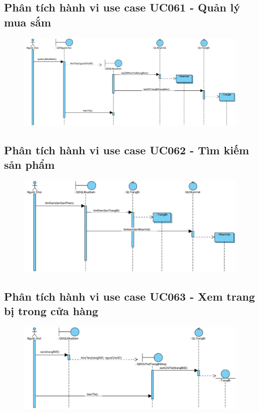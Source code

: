 \documentclass[3p]{elsarticle}
\begin{document}
\subsection{Phân tích hành vi use case UC061 - Quản lý mua sắm}
\begin{figure}[!htbp]
	\hspace*{-.5in}
	\centering
	\includegraphics[scale=.55]{images/sequence-pdfs/gamer/ShopManagement.pdf}
\end{figure}

\subsection{Phân tích hành vi use case UC062 - Tìm kiếm sản phẩm}
\begin{figure}[!htbp]
	\hspace*{-.5in}
	\centering
	\includegraphics[scale=.55]{images/sequence-pdfs/gamer/ShopManagement_Search.pdf}
\end{figure}
\newpage

\subsection{Phân tích hành vi use case UC063 - Xem trang bị trong cửa hàng}
\begin{figure}[!htbp]
	\hspace*{-.5in}
	\centering
	\includegraphics[scale=.55]{images/sequence-pdfs/gamer/ShopManagement_ViewItem.pdf}
\end{figure}
\end{document}
